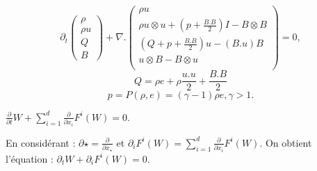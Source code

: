 \documentclass{report}
\begin{document}
  \begin{equation}
    \partial_t
    \left( \begin{array}{c}
    \rho \\
    \rho u \\
    Q \\
    B
    \end{array}
  \right)
  + \nabla .
  \left( \begin{array}{c}
    \rho u \\
    \rho u \otimes u + (p + \frac{B.B}{2})I - B \otimes B \\
    (Q + p + \frac{B.B}{2})u - (B.u)B \\
    u \otimes B - B \otimes u \\
    \end{array}
  \right)
  = 0,
  \end{equation}
  \begin{equation}
    Q = \rho e + \rho \frac{u.u}{2} + \frac{B.B}{2}
  \end{equation}
  \begin{equation}
    p = P(\rho,e) = (\gamma - 1)\rho e, \gamma > 1.
  \end{equation}



  \begin{math}
    \frac{\partial}{\partial t}W + \sum\limits_{i=1}^d \frac{\partial}{\partial x_i}F^i(W) = 0.
  \end{math}

  En consid\'erant :
  \begin{math}
    \partial\star = \frac{\partial}{\partial x_\star}
  \end{math}
   et
   \begin{math}
     \partial_iF^i(W) = \sum\limits_{i=1}^d\frac{\partial}{\partial x_i}F^i(W).
   \end{math} 
   On obtient l'\'equation :
   \begin{math}
     \partial_tW+\partial_iF^i(W) = 0.
   \end{math}
\end{document}
